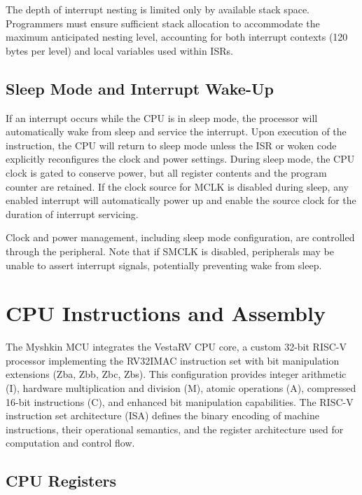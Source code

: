 \documentclass[11pt,pdftex,portrait,letterpaper]{article}
\begin{document}
The depth of interrupt nesting is limited only by available stack space. Programmers must ensure sufficient stack allocation to accommodate the maximum anticipated nesting level, accounting for both interrupt contexts (120 bytes per level) and local variables used within ISRs.

\subsection{Sleep Mode and Interrupt Wake-Up}

If an interrupt occurs while the CPU is in sleep mode, the processor will automatically wake from sleep and service the interrupt. Upon execution of the  instruction, the CPU will return to sleep mode unless the ISR or woken code explicitly reconfigures the clock and power settings. During sleep mode, the CPU clock is gated to conserve power, but all register contents and the program counter are retained. If the clock source for MCLK is disabled during sleep, any enabled interrupt will automatically power up and enable the source clock for the duration of interrupt servicing.

Clock and power management, including sleep mode configuration, are controlled through the  peripheral. Note that if SMCLK is disabled, peripherals may be unable to assert interrupt signals, potentially preventing wake from sleep.

\newpage



\section{CPU Instructions and Assembly} \label{s:cpu-instructions}

The Myshkin MCU integrates the VestaRV CPU core, a custom 32-bit RISC-V processor implementing the RV32IMAC instruction set with bit manipulation extensions (Zba, Zbb, Zbc, Zbs). This configuration provides integer arithmetic (I), hardware multiplication and division (M), atomic operations (A), compressed 16-bit instructions (C), and enhanced bit manipulation capabilities. The RISC-V instruction set architecture (ISA) defines the binary encoding of machine instructions, their operational semantics, and the register architecture used for computation and control flow.

\subsection{CPU Registers}
\end{document}
